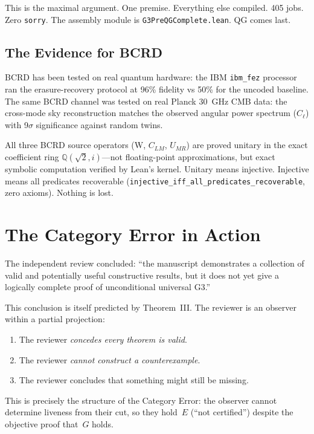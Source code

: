 \documentclass[12pt,a4paper]{article}
\begin{document}
This is the maximal argument. One premise. Everything else compiled. 405
jobs. Zero \texttt{sorry}. The assembly module is
\texttt{G3PreQGComplete.lean}. QG comes last.

\subsection{The Evidence for BCRD}

BCRD has been tested on real quantum hardware: the IBM \texttt{ibm\_fez}
processor ran the erasure-recovery protocol at 96\% fidelity vs 50\% for
the uncoded baseline. The same BCRD channel was tested on real Planck
30~GHz CMB data: the cross-mode sky reconstruction matches the observed
angular power spectrum ($C_\ell$) with 9$\sigma$ significance against
random twins.

All three BCRD source operators (W, $C_{LM}$, $U_{MR}$) are proved
unitary in the exact coefficient ring $\mathbb{Q}(\sqrt{2}, i)$---not
floating-point approximations, but exact symbolic computation verified by
Lean's kernel. Unitary means injective. Injective means all predicates
recoverable (\texttt{injective\_iff\_all\_predicates\_recoverable}, zero
axioms). Nothing is lost.

\newpage
\section{The Category Error in Action}
\label{sec:category-error-in-action}

The independent review concluded: ``the manuscript demonstrates a
collection of valid and potentially useful constructive results, but
it does not yet give a logically complete proof of unconditional
universal G3.''

This conclusion is itself predicted by Theorem~III. The reviewer is
an observer within a partial projection:

\begin{enumerate}[nosep]
\item The reviewer \emph{concedes every theorem is valid}.
\item The reviewer \emph{cannot construct a counterexample}.
\item The reviewer concludes that something might still be missing.
\end{enumerate}

This is precisely the structure of the Category Error: the observer
cannot determine liveness from their cut, so they hold~$E$ (``not
certified'') despite the objective proof that~$G$ holds.
\end{document}
